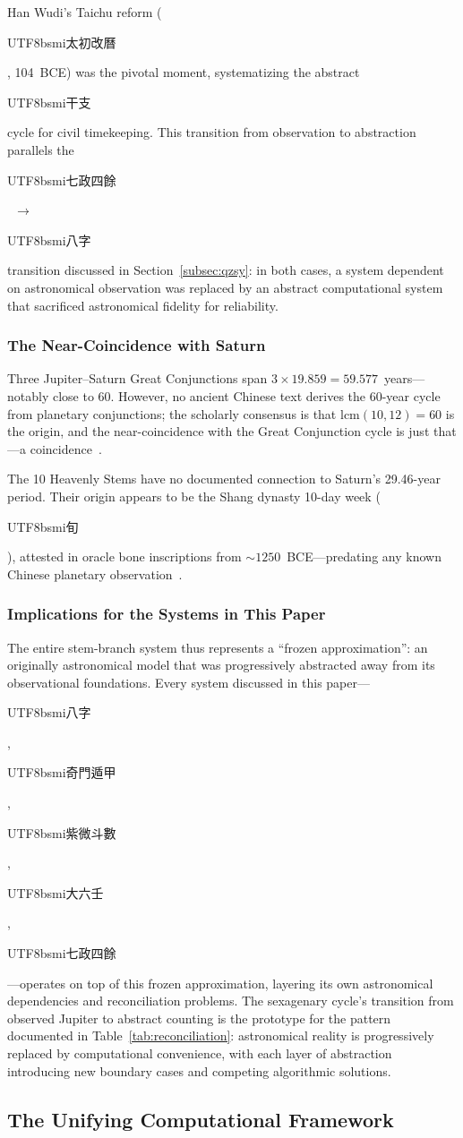 \documentclass[10pt,a4paper]{article}
\newcommand{\zh}[1]{\begin{CJK}{UTF8}{bsmi}#1\end{CJK}}
\begin{document}
\noindent
Han Wudi's Taichu reform (\zh{太初改曆}, 104~BCE) was the pivotal
moment, systematizing the abstract \zh{干支} cycle for civil
timekeeping. This transition from observation to abstraction parallels
the \zh{七政四餘}~$\to$~\zh{八字} transition discussed in
Section~\ref{subsec:qzsy}: in both cases, a system dependent on
astronomical observation was replaced by an abstract computational
system that sacrificed astronomical fidelity for reliability.

\subsubsection{The Near-Coincidence with Saturn}

Three Jupiter--Saturn Great Conjunctions span $3 \times 19.859 =
59.577$~years---notably close to 60. However, no ancient Chinese
text derives the 60-year cycle from planetary conjunctions; the scholarly
consensus is that $\text{lcm}(10, 12) = 60$ is the origin, and the
near-coincidence with the Great Conjunction cycle is just that---a
coincidence~\cite{needham1959}.

The 10 Heavenly Stems have no documented connection to Saturn's
29.46-year period. Their origin appears to be the Shang dynasty 10-day
week (\zh{旬}), attested in oracle bone inscriptions from
${\sim}1250$~BCE---predating any known Chinese planetary
observation~\cite{smith_2011}.

\subsubsection{Implications for the Systems in This Paper}

The entire stem-branch system thus represents a ``frozen approximation'':
an originally astronomical model that was progressively abstracted away
from its observational foundations. Every system discussed in this
paper---\zh{八字}, \zh{奇門遁甲}, \zh{紫微斗數}, \zh{大六壬},
\zh{七政四餘}---operates on top of this frozen approximation, layering
its own astronomical dependencies and reconciliation problems. The
sexagenary cycle's transition from observed Jupiter to abstract counting
is the prototype for the pattern documented in
Table~\ref{tab:reconciliation}: astronomical reality is progressively
replaced by computational convenience, with each layer of abstraction
introducing new boundary cases and competing algorithmic solutions.

\subsection{The Unifying Computational Framework}
\end{document}
